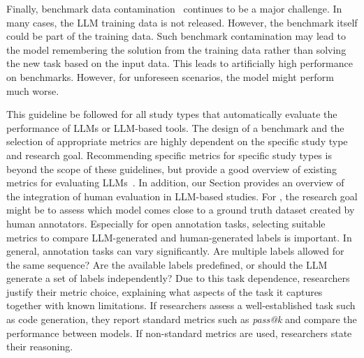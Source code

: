 Finally, benchmark data contamination~\cite{DBLP:journals/corr/abs-2406-04244} continues to be a major challenge.
In many cases, the LLM training data is not released.
However, the benchmark itself could be part of the training data.
Such benchmark contamination may lead to the model remembering the solution from the training data rather than solving the new task based on the input data.
This leads to artificially high performance on benchmarks.
However, for unforeseen scenarios, the model might perform much worse.



This guideline \must be followed for all study types that automatically evaluate the performance of LLMs or LLM-based tools.
The design of a benchmark and the selection of appropriate metrics are highly dependent on the specific study type and research goal.
Recommending specific metrics for specific study types is beyond the scope of these guidelines, but \citeauthor{hu2025assessingadvancingbenchmarksevaluating} provide a good overview of existing metrics for evaluating LLMs~\cite{hu2025assessingadvancingbenchmarksevaluating}.
In addition, our Section \humanvalidation provides an overview of the integration of human evaluation in LLM-based studies. 
For \annotators, the research goal might be to assess which model comes close to a ground truth dataset created by human annotators.
Especially for open annotation tasks, selecting suitable metrics to compare LLM-generated and human-generated labels is important.
In general, annotation tasks can vary significantly.
Are multiple labels allowed for the same sequence? Are the available labels predefined, or should the LLM generate a set of labels independently?
Due to this task dependence, researchers \must justify their metric choice, explaining what aspects of the task it captures together with known limitations.
If researchers assess a well-established task such as code generation, they \should report standard metrics such as \emph{pass@k} and compare the performance between models.
If non-standard metrics are used, researchers \must state their reasoning.
